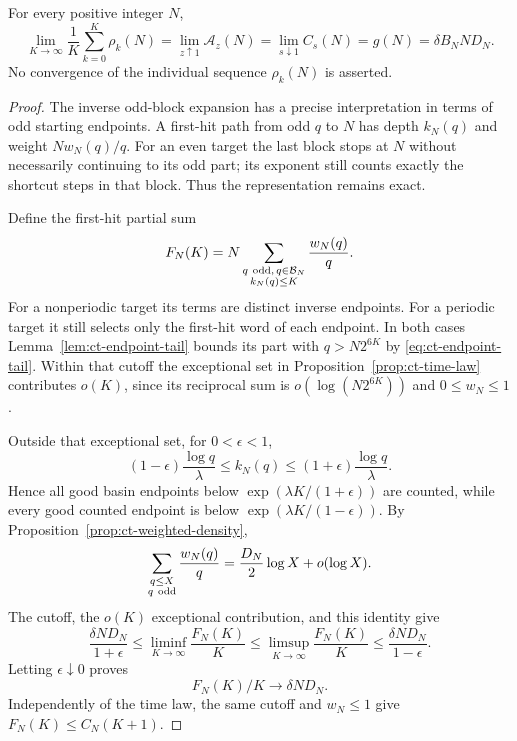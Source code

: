 \begin{theorem}\label{thm:ct-canonical-identification}
For every positive integer \(N\),
\begin{equation}\label{eq:ct-canonical-identification}
 \lim_{K\to\infty}\frac1K\sum_{k=0}^K\rho_k(N)
 =\lim_{z\uparrow1}\mathcal A_z(N)
 =\lim_{s\downarrow1}C_s(N)
 =g(N)=\delta B_NND_N.
\end{equation}
No convergence of the individual sequence \(\rho_k(N)\) is
asserted.
\end{theorem}
\begin{proof}
The inverse odd-block expansion has a precise interpretation in
terms of odd starting endpoints. A first-hit path from odd \(q\)
to \(N\) has depth \(k_N(q)\) and weight \(Nw_N(q)/q\).
For an even target the last block stops at \(N\) without necessarily
continuing to its odd part; its exponent still counts exactly the
shortcut steps in that block. Thus the representation remains exact.

Define the first-hit partial sum
\[
 F_N(K)=N\sum_{\substack{q\ {\rm odd},\,q\in\mathcal B_N\\
                       k_N(q)\le K}}\frac{w_N(q)}q.
\]
For a nonperiodic target its terms are distinct inverse endpoints.
For a periodic target it still selects only the first-hit word of
each endpoint. In both cases
Lemma~\ref{lem:ct-endpoint-tail} bounds its part with
\(q>N2^{6K}\) by \eqref{eq:ct-endpoint-tail}.
Within that cutoff the exceptional set in
Proposition~\ref{prop:ct-time-law} contributes \(o(K)\), since
its reciprocal sum is \(o(\log(N2^{6K}))\) and \(0\le w_N\le1\).

Outside that exceptional set, for \(0<\epsilon<1\),
\[
 (1-\epsilon)\frac{\log q}{\lambda}
       \le k_N(q)\le
 (1+\epsilon)\frac{\log q}{\lambda}.
\]
Hence all good basin endpoints below
\(\exp(\lambda K/(1+\epsilon))\) are counted, while every good
counted endpoint is below
\(\exp(\lambda K/(1-\epsilon))\).
By Proposition~\ref{prop:ct-weighted-density},
\[
 \sum_{\substack{q\le X\\q\ {\rm odd}}}\frac{w_N(q)}q
       =\frac{D_N}{2}\log X+o(\log X).
\]
The cutoff, the \(o(K)\) exceptional contribution, and this identity
give
\[
 \frac{\delta ND_N}{1+\epsilon}
 \le\liminf_{K\to\infty}\frac{F_N(K)}K
 \le\limsup_{K\to\infty}\frac{F_N(K)}K
 \le\frac{\delta ND_N}{1-\epsilon}.
\]
Letting \(\epsilon\downarrow0\) proves
\begin{equation}\label{eq:ct-first-hit-Cesaro}
 F_N(K)/K\longrightarrow\delta ND_N.
\end{equation}
Independently of the time law, the same cutoff and \(w_N\le1\)
give \(F_N(K)\le C_N(K+1)\).


\end{proof}
